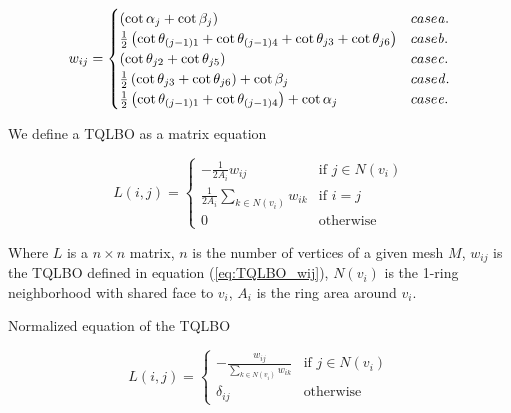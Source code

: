 \documentclass[10pt, conference]{IEEEtran}
\begin{document}
{\small 
\begin{equation}
w_{ij}=\begin{cases}
\left(\cot\alpha_{j}+\cot\beta_{j}\right) & \mbox{case }\mathit{a.}\\
\frac{1}{2}\left(\cot\theta_{\left(j-1\right)1}+\cot\theta_{\left(j-1\right)4}+\cot\theta_{j3}+\cot\theta_{j6}\right) & \mbox{case \ensuremath{\mathit{b}}.}\\
\left(\cot\theta_{j2}+\cot\theta_{j5}\right) & \mbox{case \ensuremath{\mathit{c}}.}\\
\frac{1}{2}\left(\cot\theta_{j3}+\cot\theta_{j6}\right)+\cot\beta_{j} & \mbox{case \ensuremath{\mathit{d}}.}\\
\frac{1}{2}\left(\cot\theta_{\left(j-1\right)1}+\cot\theta_{\left(j-1\right)4}\right)+\cot\alpha_{j} & \mbox{case \ensuremath{\mathit{e}}.}
\end{cases}\label{eq:TQLBO_wij}
\end{equation}
}{\small \par}

We define a TQLBO as a matrix equation

\begin{equation}
L\left(i,j\right)=\begin{cases}
-\frac{1}{2A_{i}}w_{ij} & \mbox{if }j\in N\left(v_{i}\right)\\
\frac{1}{2A_{i}}\underset{k\in N\left(v_{i}\right)}{\sum}w_{ik} & \mbox{if }i=j\\
0 & \mbox{otherwise}
\end{cases}\label{eq:TQLBO_Simple_Matrix}
\end{equation}


Where $L$ is a $n\times n$ matrix, $n$ is the number of vertices
of a given mesh $M$, $w_{ij}$ is the TQLBO defined in equation (\ref{eq:TQLBO_wij}),
$N\left(v_{i}\right)$ is the 1-ring neighborhood with shared face
to $v_{i}$, $A_{i}$ is the ring area around $v_{i}$.

Normalized equation of the TQLBO

\begin{equation}
L\left(i,j\right)=\begin{cases}
-\frac{w_{ij}}{\underset{k\in N\left(v_{i}\right)}{\sum}w_{ik}} & \mbox{if }j\in N\left(v_{i}\right)\\
\delta_{ij} & \mbox{otherwise}
\end{cases}\label{eq:TQLBO-Normalized_Matrix}
\end{equation}
\end{document}
